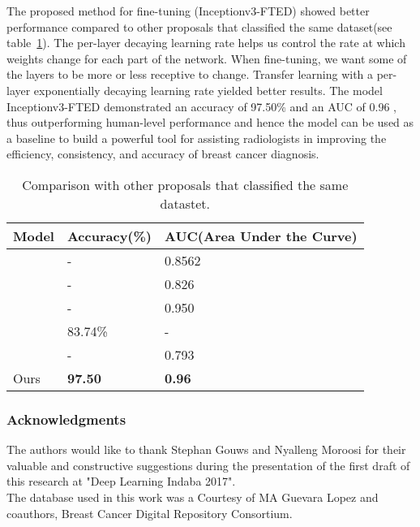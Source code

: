 \documentclass{article}
\begin{document}
The proposed method for fine-tuning (Inceptionv3-FTED) showed better performance compared to other proposals that classified the same dataset(see table~\ref{comp}).
The per-layer decaying learning rate helps us control the rate at which weights change for each part of the network. When fine-tuning, we want some of the layers to be more or less receptive to change. Transfer learning with a per-layer exponentially decaying learning rate yielded better results.
The model Inceptionv3-FTED demonstrated an accuracy of 97.50\% and an AUC of 0.96 , thus outperforming human-level performance \citep{elmore2009variability} and hence the model can be used as a baseline to build a powerful tool for assisting radiologists in improving the efficiency, consistency, and accuracy of breast cancer diagnosis.

\begin{table}[h]
  \caption{Comparison with other proposals that classified the same datastet.}
  \label{comp}
  \centering
  \begin{tabular}{lll}
    \toprule
    Model    				    & Accuracy(\%)  & AUC(Area Under the Curve)   \\
    \midrule
    \citep{perez2014improving}  		& -  		&0.8562     \\
    \citep{arevalo2016representation}& -  		&0.826      \\
    \citep{padillabreast}   		 	&-  			&0.950      \\
    \citep{jadoon2017three}          &83.74\%  	&-    	    \\
    \citep{perre2017lesion}   	    &-  			&0.793    	\\
     Ours   				& \textbf{97.50}			&\textbf{0.96}        \\
    \bottomrule
  \end{tabular}
\end{table}


\subsubsection*{Acknowledgments}
The authors would like to thank Stephan Gouws and Nyalleng Moroosi for their valuable and constructive suggestions during the presentation of the first draft of this research at "Deep Learning Indaba 2017".\\
The database used in this work was a Courtesy of MA Guevara Lopez and coauthors, Breast Cancer Digital Repository Consortium.



\end{document}
